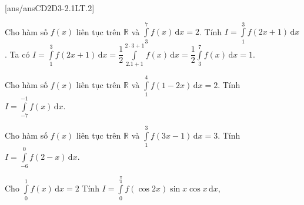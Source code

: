 [ans/ansCD2D3-2.1LT.2]
\begin{ex}%
	Cho hàm số $f(x)$ liên tục trên $\mathbb{R}$ và $\displaystyle \int\limits_3^7 f(x)\mathrm{\,d}x=2$. Tính $\displaystyle I=\int\limits_1^3 f(2x+1)\mathrm{\,d}x$.
	\loigiai
	{
	Ta có $I=\displaystyle\int\limits_1^3 f(2x+1)\mathrm{\,d}x=\dfrac{1}{2}\displaystyle\int\limits_{2.1+1}^{2\cdot 3+1} f(x)\mathrm{\,d}x=\dfrac{1}{2}\displaystyle\int\limits_3^7 f(x)\mathrm{\,d}x=1$.
	}
\end{ex}
\begin{ex}%
	Cho hàm số $f(x)$ liên tục trên $\mathbb{R}$ và $\displaystyle\int\limits_1^4 f(1-2x)\mathrm{\,d}x=2$. Tính $I=\displaystyle\int\limits_{-7}^{-1} f(x)\mathrm{\,d}x$.
\end{ex}
\begin{ex}%
	Cho hàm số $f(x)$ liên tục trên $\mathbb{R}$ và $\displaystyle\int\limits_1^3 f(3x-1)\mathrm{\,d}x=3$. Tính $I=\displaystyle\int\limits_{-6}^0 f(2-x)\mathrm{\,d}x$.
\end{ex}
\begin{ex}%
	Cho $\displaystyle\int\limits_0^1 f(x)\mathrm{\,d}x=2$ Tính $I=\displaystyle\int\limits_0^{\tfrac{\pi}{4}} f(\cos 2x)\sin x\cos x\mathrm{\,d}x$,
\end{ex}
